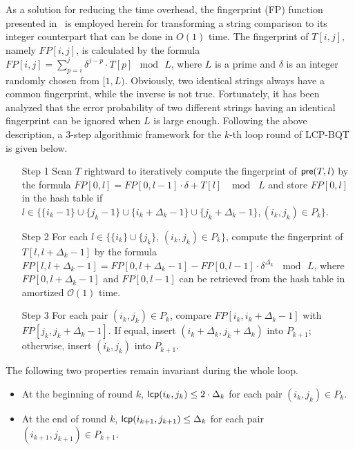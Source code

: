 \documentclass[10pt,journal,compsoc]{IEEEtran}
\begin{document}
\begin{CJK*}{GBK}{song}
As a solution for reducing the time overhead, the fingerprint (FP) function presented in~\cite{Karp1987} is employed herein for transforming a string comparison to its integer counterpart that can be done in $O(1)$ time. The fingerprint of $T[i,j]$, namely $FP[i,j]$, is calculated by the formula $FP[i,j] = \sum_{p=i}^{j} \delta^{j-p} \cdot T[p] \mod \, L$, where $L$ is a prime and $\delta$ is an integer randomly chosen from $[1,L)$. Obviously, two identical strings always have a common fingerprint, while the inverse is not true. Fortunately, it has been analyzed that the error probability of two different strings having an identical fingerprint can be ignored when $L$ is large enough. Following the above description, a 3-step algorithmic framework for the $k$-th loop round of LCP-BQT is given below.

\begin{enumerate}
\item[Step 1] Scan $T$ rightward to iteratively compute the fingerprint of ${\sf pre}(T,l)$ by the formula $FP[0,l] = FP[0,l-1] \cdot \delta + T[l] \,\, \mod \,\, L$ and store $FP[0,l]$ in the hash table if $l\in \{ \{i_k-1\}\cup\{j_k-1\}\cup\{i_k +\Delta_{k} - 1\}\cup\{j_k+ \Delta_{k} - 1\},(i_k,j_k)\in P_k\}$.
\item[Step 2] For each $l\in \{\{i_k\}\cup \{j_k\}$, $(i_k,j_k)\in P_k\}$, compute the fingerprint of $T[l,l+\Delta_{k} - 1]$ by the formula $FP[l,l+ \Delta_{k} - 1]=FP[0,l+ \Delta_{k} - 1] - FP[0,l-1] \cdot \delta^{\Delta_{k}} \, \mod \, L$, where $FP[0,l+ \Delta_{k} - 1]$ and $FP[0,l-1]$ can be retrieved from the hash table in amortized $\mathcal{O}(1)$ time.
\item[Step 3] For each pair $(i_k,j_k)\in P_k$, compare $FP[i_k,i_k+\Delta_{k} - 1]$ with $FP[j_k,j_k+\Delta_{k} - 1]$. If equal, insert $(i_k+\Delta_{k},j_k+\Delta_{k})$ into $P_{k+1}$; otherwise, insert $(i_k, j_k)$ into $P_{k+1}$.
\end{enumerate}

The following two properties remain invariant during the whole loop.

\begin{itemize}
\item At the beginning of round $k$, ${\sf lcp}(i_k,j_k) \le 2 \cdot \Delta_{k}$ for each pair $(i_k,j_k) \in P_k$.
\item At the end of round $k$, ${\sf lcp}(i_{k+1},j_{k+1}) \le \Delta_{k}$ for each pair $(i_{k+1},j_{k+1}) \in P_{k+1}$.
\end{itemize}


\end{CJK*}
\end{document}
